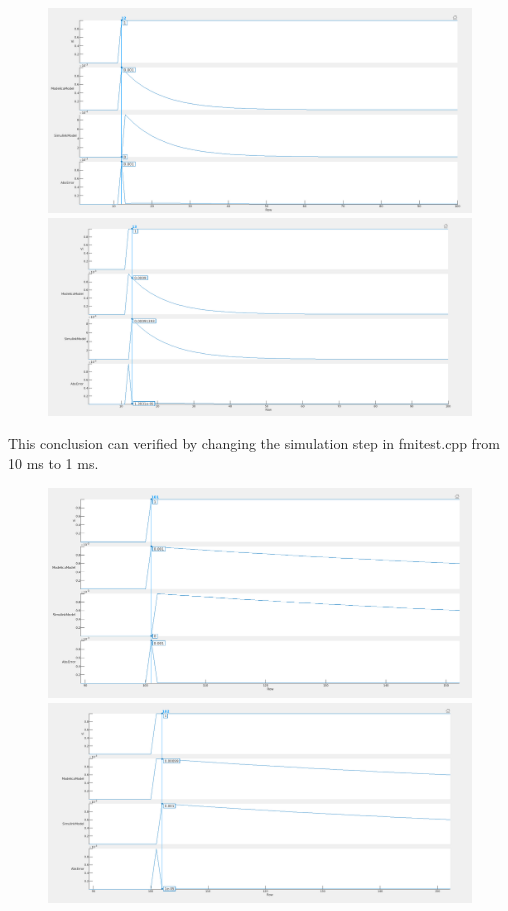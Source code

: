 \begin{figure}[ht]
\centering
\includegraphics[width=1.0\textwidth]{CsvComparison2.png}
\includegraphics[width=1.0\textwidth]{CsvComparison3.png}
\end{figure}
This conclusion can verified by changing the simulation step in fmitest.cpp from 10 ms to 1 ms.
\begin{figure}[ht]
\centering
\includegraphics[width=1.0\textwidth]{CsvComparison4.png}
\includegraphics[width=1.0\textwidth]{CsvComparison5.png}
\end{figure}
